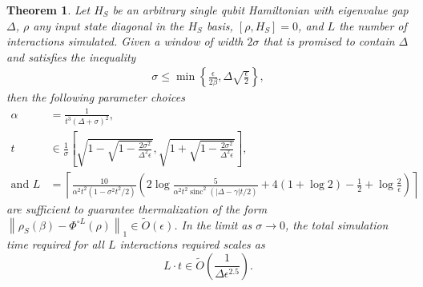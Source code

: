 \documentclass[
 amsmath,amssymb,
 aps,
onecolumn, 
nofootinbib]{revtex4-2}
\newtheorem{theorem}{Theorem}
\newcommand{\norm}[1]{\left\| #1 \right\|}
\newcommand{\set}[1]{\left\{ #1 \right\}}
\newcommand{\bigotilde}[1]{\widetilde{O} \left( #1 \right)}
\DeclareMathOperator{\sinc}{sinc}
\begin{document}
\begin{theorem} \label{thm:single_qubit}
    Let $H_S$ be an arbitrary single qubit Hamiltonian with eigenvalue gap $\Delta$, $\rho$ any input state diagonal in the $H_S$ basis, $[\rho, H_S] = 0$, and $L$ the number of interactions simulated. Given a window of width $2 \sigma$ that is promised to contain $\Delta$ and satisfies the inequality
    \begin{align}
        \sigma \le \min \set{\frac{\epsilon}{2\beta}, \Delta \sqrt{\frac{\epsilon}{2}}},
    \end{align}
    then the following parameter choices 
    \begin{align}
        \alpha &= \frac{1}{t^3(\Delta + \sigma)^2}, \nonumber \\
        t &\in \frac{1}{\sigma}\left[\sqrt{1 - \sqrt{1 - \frac{2 \sigma^2}{\Delta^2 \epsilon}} }, \sqrt{1 + \sqrt{1 - \frac{2 \sigma^2}{\Delta^2 \epsilon}} } \right], \nonumber\\
        \text{and } L &= \left\lceil\frac{10}{\alpha^2 t^2 (1 - \sigma^2 t^2 / 2)} \left( 2 \log \frac{5}{\alpha^2 t^2 \sinc^2(|\Delta - \gamma|t/2)} + 4( 1 + \log 2) - \frac{1}{2} + \log \frac{2}{\epsilon} \right)\right\rceil
    \end{align}
    are sufficient to guarantee thermalization of the form $\norm{\rho_S(\beta) - \Phi^{\circ L}(\rho)}_1 \in \bigotilde{\epsilon}$. In the limit as $\sigma \to 0$, the total simulation time required for all $L$ interactions required scales as
    \begin{equation}
        L \cdot t \in \widetilde{O} \left( \frac{1}{\Delta \epsilon^{2.5}}\right).
    \end{equation}
\end{theorem}
\end{document}
